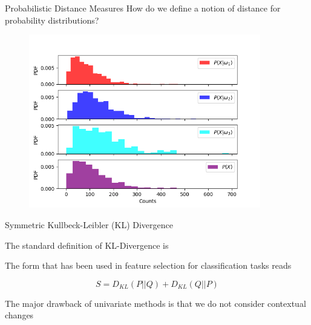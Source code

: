 \documentclass{beamer}					%
\begin{document}
\begin{frame}{Probabilistic Distance Measures}
\vspace{0.2in}
How do we define a notion of distance for probability distributions?
\begin{center}
\begin{figure}
\includegraphics[width=0.9\textwidth]{hists.png}
\end{figure}
\end{center}
\end{frame}

\begin{frame}{Symmetric Kullbeck-Leibler (KL) Divergence}

The standard definition of KL-Divergence is 

The form that has been used in feature selection for classification tasks reads

\begin{equation*}
S = D_{KL}(P||Q) + D_{KL}(Q||P)
\end{equation*}

The major drawback of univariate methods is that we do not consider contextual changes 

\end{frame}
\end{document}
